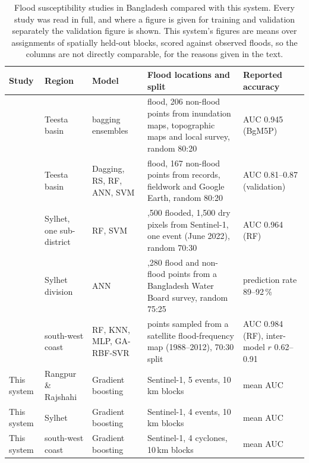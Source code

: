 \documentclass[10pt,a4paper,twocolumn]{article}
\begin{document}
\begin{table}[t]
\centering
\small
\begin{tabularx}{\textwidth}{>{\raggedright\arraybackslash}p{2.4cm}>{\raggedright\arraybackslash}p{2.1cm}>{\raggedright\arraybackslash}p{2.5cm}>{\raggedright\arraybackslash}X>{\raggedright\arraybackslash}p{2.2cm}}
\toprule
Study & Region & Model & Flood locations and split & Reported accuracy \\
\midrule
\citet{talukdar2020} & Teesta basin & bagging ensembles & 207 flood, 206 non-flood points from inundation maps, topographic maps and local survey, random 80:20 & AUC 0.945 (BgM5P) \\
\citet{islam2021} & Teesta basin & Dagging, RS, RF, ANN, SVM & 167 flood, 167 non-flood points from records, fieldwork and Google Earth, random 80:20 & AUC 0.81--0.87 (validation) \\
\citet{islamr2024} & Sylhet, one sub-district & RF, SVM & 1,500 flooded, 1,500 dry pixels from Sentinel-1, one event (June 2022), random 70:30 & AUC 0.964 (RF) \\
\citet{rudra2023} & Sylhet division & ANN & 1,280 flood and non-flood points from a Bangladesh Water Board survey, random 75:25 & prediction rate 89--92\,\% \\
\citet{adnan2023} & south-west coast & RF, KNN, MLP, GA-RBF-SVR & 965 points sampled from a satellite flood-frequency map (1988--2012), 70:30 split & AUC 0.984 (RF), inter-model $r$ 0.62--0.91 \\
\midrule
This system & Rangpur \& Rajshahi & Gradient boosting & Sentinel-1, 5 events, 10\,km blocks & mean AUC \RRBenchBoostingAUC{} \\
This system & Sylhet & Gradient boosting & Sentinel-1, 4 events, 10\,km blocks & mean AUC \SylhetBenchBoostingAUC{} \\
This system & south-west coast & Gradient boosting & Sentinel-1, 4 cyclones, 10\,km blocks & mean AUC \CoastalBenchBoostingAUC{} \\
\bottomrule
\end{tabularx}
\caption{Flood susceptibility studies in Bangladesh compared with this system. Every study was read in full, and where a figure is given for training and validation separately the validation figure is shown. This system's figures are means over \RRBenchSeeds{} assignments of spatially held-out blocks, scored against observed floods, so the columns are not directly comparable, for the reasons given in the text.}
\label{tab:litflood}
\end{table}
\end{document}
